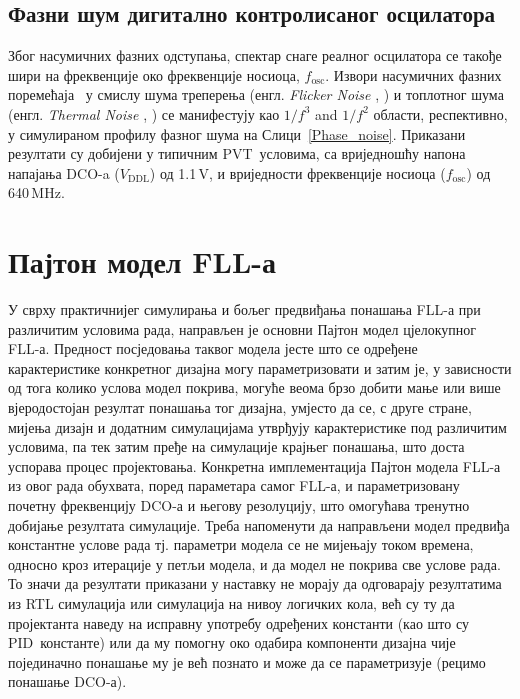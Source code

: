 \documentclass[master]{finthesis}
\makeatletter
\newcommand*{\engl}[2][\@empty]{%
    \edef\theacronym{#1}%
    (енгл. \foreignlanguage{english}{\emph{#2}%
    \ifx\theacronym\@empty \else , #1\fi})%
}
\def \FLL  {FLL} %
\def \DCO  {DCO} %
\def \PID  {PID} %
\def \PVT  {PVT} %
\makeatother
\begin{document}
\subsection{Фазни шум дигитално контролисаног осцилатора}
Због насумичних фазних одступања, спектар снаге реалног осцилатора се такође шири на фреквенције око фреквенције носиоца, $f_\text{osc}$. Извори насумичних фазних поремећаја~\cite{Milovanovic:8190103} у смислу шума треперења \engl{Flicker Noise} и топлотног шума \engl{Thermal Noise} се манифестују као $1/f^3$ and $1/f^2$ области, респективно, у симулираном профилу фазног шума на Слици~\ref{Phase_noise}. Приказани резултати су добијени у типичним \PVT\ условима, са вриједношћу напона напајања \DCO-a ($V_\text{DDL}$) од 1.1\,V, и вриједности фреквенције носиоца ($f_\text{osc}$) од 640\,MHz.


\section{Пајтон модел \FLL-а} \label{section:python_model}
У сврху практичнијег симулирања и бољег предвиђања понашања \FLL-а при различитим условима рада, направљен је основни Пајтон модел цјелокупног \FLL-а. Предност посједовања таквог модела јесте што се одређене карактеристике конкретног дизајна могу параметризовати и затим је, у зависности од тога колико услова модел покрива, могуће веома брзо добити мање или више вјеродостојан резултат понашања тог дизајна, умјесто да се, с друге стране, мијења дизајн и додатним симулацијама утврђују карактеристике под различитим условима, па тек затим пређе на симулације крајњег понашања, што доста успорава процес пројектовања. Конкретна имплементација Пајтон модела \FLL-а из овог рада обухвата, поред параметара самог \FLL-а, и параметризовану почетну фреквенцију \DCO-а и његову резолуцију, што омогућава тренутно добијање резултата симулације. Треба напоменути да направљени модел предвиђа константне услове рада тј. параметри модела се не мијењају током времена, односно кроз итерације у петљи модела, и да модел не покрива све услове рада. То значи да резултати приказани у наставку не морају да одговарају резултатима из RTL симулација или симулација на нивоу логичких кола, већ су ту да пројектанта наведу на исправну употребу одређених константи (као што су \PID\ константе) или да му помогну око одабира компоненти дизајна чије појединачно понашање му је већ познато и може да се параметризује (рецимо понашање \DCO-а). \par
\end{document}
